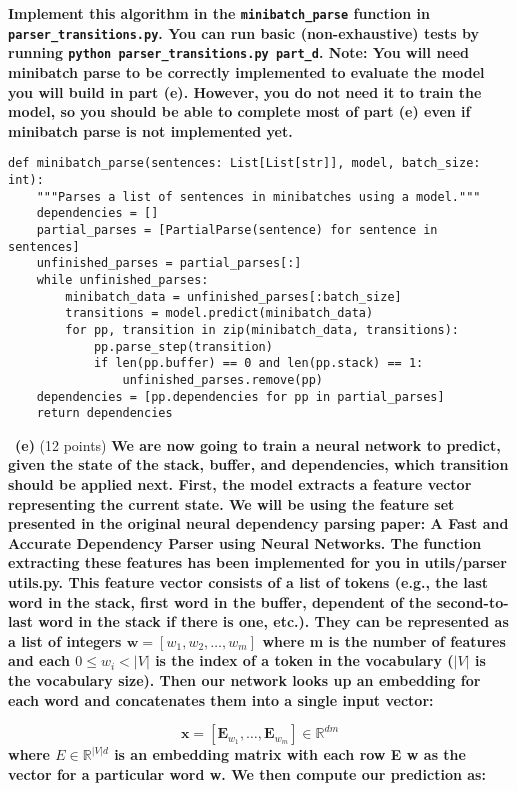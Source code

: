 \documentclass[a4 paper]{article}
\newcommand{\subproblem}[1]{~\newline\textbf{(#1)}}
\begin{document}
\textbf{Implement this algorithm in the \texttt{minibatch\_parse} function in \texttt{parser\_transitions.py}.
You can run basic (non-exhaustive) tests by running \texttt{python parser\_transitions.py part\_d}. Note: You will need minibatch parse to be correctly implemented to evaluate the model you will build in part (e).
However, you do not need it to train the model, so you should be able to complete most of part (e) even if minibatch parse is not implemented yet.}

\begin{lstlisting}[label={list:first},caption=minibatch\_parse.]
def minibatch_parse(sentences: List[List[str]], model, batch_size: int):
    """Parses a list of sentences in minibatches using a model."""
    dependencies = []
    partial_parses = [PartialParse(sentence) for sentence in sentences]
    unfinished_parses = partial_parses[:]
    while unfinished_parses:
        minibatch_data = unfinished_parses[:batch_size]
        transitions = model.predict(minibatch_data)
        for pp, transition in zip(minibatch_data, transitions):
            pp.parse_step(transition)
            if len(pp.buffer) == 0 and len(pp.stack) == 1:
                unfinished_parses.remove(pp)
    dependencies = [pp.dependencies for pp in partial_parses]
    return dependencies
\end{lstlisting}

\subproblem{e} (12 points) \textbf{We are now going to train a neural network to predict, given the state of the stack, buffer, and dependencies, which transition should be applied next.
First, the model extracts a feature vector representing the current state.
We will be using the feature set presented in the original neural dependency parsing paper: A Fast and Accurate Dependency Parser using Neural Networks.
The function extracting these features has been implemented for you in utils/parser utils.py.
This feature vector consists of a list of tokens (e.g., the last word in the stack, ﬁrst word in the buﬀer, dependent of the second-to-last word in the stack if there is one, etc.).
They can be represented as a list of integers $\textbf{w} = [w_1, w_2, \dots, w_m ]$ where m is the number of features and each $0 \leq w_{i}<|V|$ is the index of a token in the vocabulary ($|V|$ is the vocabulary size).
Then our network looks up an embedding for each word and concatenates them into a single input vector:}

\begin{equation}
    \mathbf{x}=\left[\mathbf{E}_{w_{1}}, \dots, \mathbf{E}_{w_{m}}\right] \in \mathbb{R}^{d m}
\end{equation}
\textbf{where $E\in \mathbb{R}^{|V|d} $ is an embedding matrix with each row E w as the vector for a particular word w.
We then compute our prediction as:}
\end{document}
